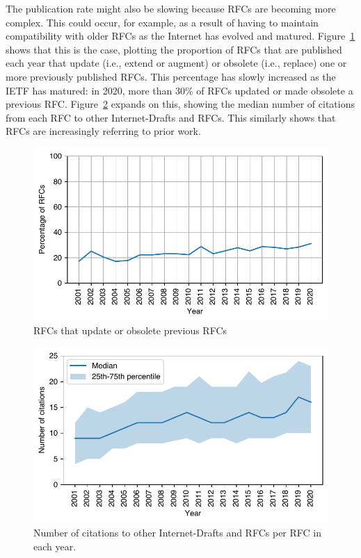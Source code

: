 \documentclass[twocolumn,10pt]{article}
\newlength{\figureWidthOneColumn}
\begin{document}
The publication rate might also be slowing because RFCs are becoming more
complex. This could occur, for example, as a result of having to maintain
compatibility with older RFCs as the Internet has evolved and matured.
Figure~\ref{fig:updates_year} shows that this is the case, plotting the
proportion of RFCs that are published each year that update (i.e., extend
or augment) or obsolete (i.e., replace) one or more previously published
RFCs.  This percentage has slowly increased as the IETF has matured: in
2020, more than 30\% of RFCs updated or made obsolete a previous RFC.
%
Figure~\ref{fig:citations_year} expands on this, showing the median number
of citations from each RFC to other Internet-Drafts and RFCs. This
similarly shows that RFCs are increasingly referring to prior work.

\begin{figure}
  \centering
  \includegraphics[width=\figureWidthOneColumn]{figures-prev/imc-2021/documents/update_obsolete_yearly_pct.pdf}
  \caption{
    RFCs that update or obsolete previous RFCs
  }
  \label{fig:updates_year}
\end{figure}

\begin{figure}
  \centering
  \includegraphics[width=\figureWidthOneColumn]{figures-prev/imc-2021/documents/cite_counts_yearly.pdf}
  \caption{
    Number of citations to other Internet-Drafts and RFCs per RFC in each
    year.
  }
  \label{fig:citations_year}
\end{figure}
\end{document}
